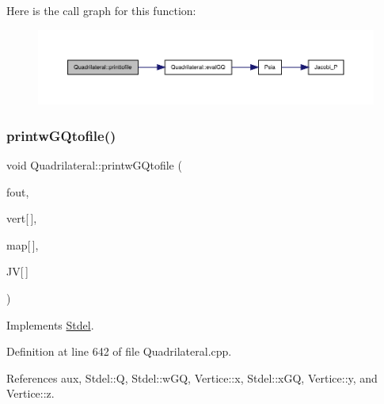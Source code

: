 Here is the call graph for this function\+:
\nopagebreak
\begin{figure}[H]
\begin{center}
\leavevmode
\includegraphics[width=350pt]{classQuadrilateral_a45573246616ded9a71b895de3969c20d_cgraph}
\end{center}
\end{figure}
\mbox{\label{classQuadrilateral_aceee4f58dc5e22dbe9e397d6a63a5248}} 
\subsubsection{\texorpdfstring{printw\+G\+Qtofile()}{printwGQtofile()}}
{\footnotesize\ttfamily void Quadrilateral\+::printw\+G\+Qtofile (\begin{DoxyParamCaption}\item[{F\+I\+LE $\ast$}]{fout,  }\item[{const \hyperlink{structVertice}{Vertice}}]{vert\mbox{[}$\,$\mbox{]},  }\item[{const int}]{map\mbox{[}$\,$\mbox{]},  }\item[{const double}]{JV\mbox{[}$\,$\mbox{]} }\end{DoxyParamCaption})\hspace{0.3cm}{\ttfamily [virtual]}}



Implements \hyperlink{classStdel_aec7751f7873772d930c91cf93ec6b07b}{Stdel}.



Definition at line 642 of file Quadrilateral.\+cpp.



References aux, Stdel\+::Q, Stdel\+::w\+GQ, Vertice\+::x, Stdel\+::x\+GQ, Vertice\+::y, and Vertice\+::z.

\mbox{\label{classStdel_aeea4659f5bcabbf1acb374180c43a293}} 
